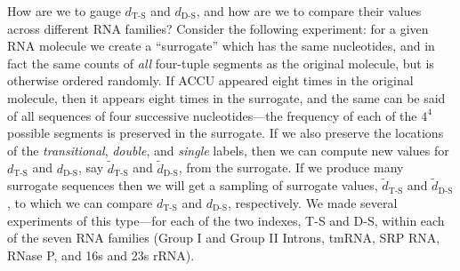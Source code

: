 \documentclass[10pt,letterpaper]{article}
\begin{document}
How are
we to gauge $d_\text{T-S}$ and $d_\text{D-S}$, and how are we to compare their values across different RNA families? 
Consider the following experiment: for a given RNA molecule we create a ``surrogate'' which has the same nucleotides, and in fact the same counts of {\em all} four-tuple segments as the original molecule, but is otherwise ordered randomly. If ACCU appeared eight times in the original molecule, then it appears eight times in the surrogate, and the same can be said of all sequences of four successive nucleotides---the frequency of each of the $4^4$ possible segments is preserved in the surrogate.  If we also preserve the locations of the {\it transitional}, {\it double}, and {\it single} labels, then we can compute new values for $d_\text{T-S}$ and $d_\text{D-S}$,
say  $\tilde{d}_\text{T-S}$ and $\tilde{d}_\text{D-S}$, from the surrogate. If we produce many surrogate sequences then we will get a sampling of  
surrogate values, $\tilde{d}_\text{T-S}$ and $\tilde{d}_\text{D-S}$, to which we can compare $d_\text{T-S}$ and $d_\text{D-S}$, respectively. We made several experiments of this type---for each of the two indexes, T-S and D-S, within each of the seven RNA families (Group I and Group II Introns, tmRNA, SRP RNA, RNase P, and 16s and 23s rRNA).
\end{document}
